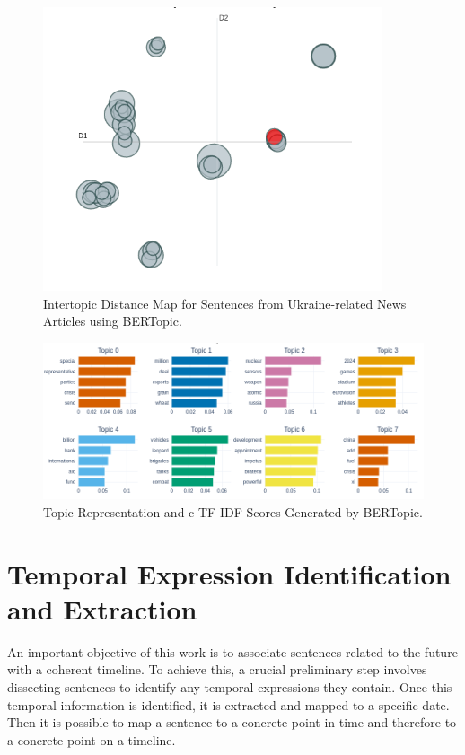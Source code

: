 \documentclass[a4paper,10pt]{report} %
\begin{document}
\begin{figure}
  \centering
  \includegraphics[width=10cm]{img/intertopic_distance_map.png}
  \caption{Intertopic Distance Map for Sentences from Ukraine-related News Articles using BERTopic.}
  \label{fig:intertopic_distance_map}
\end{figure}

\begin{figure}
  \centering
  \includegraphics[width=15cm]{img/topic_representation.png}
  \caption{Topic Representation and c-TF-IDF Scores Generated by BERTopic.}
  \label{fig:topic_representation}
\end{figure}


\chapter{Temporal Expression Identification and Extraction}
An important objective of this work is to associate sentences related to the future with a coherent timeline. To achieve this, a crucial preliminary step involves dissecting sentences to identify any temporal expressions they contain. Once this temporal information is identified, it is extracted and mapped to a specific date. Then it is possible to map a sentence to a concrete point in time and therefore to a concrete point on a timeline.
\end{document}
